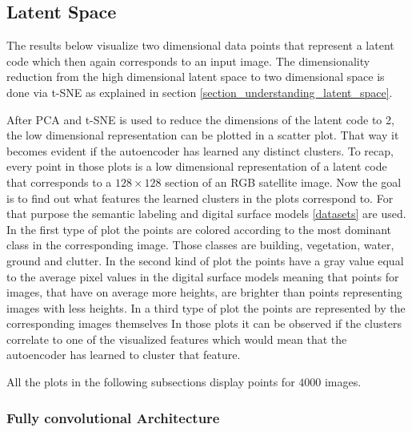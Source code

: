 
\subsection{Latent Space} \label{latent_space_experiments}

The results below visualize two dimensional data points that represent a latent code which then again corresponds
to an input image. The dimensionality reduction from the high dimensional latent space to two dimensional space
is done via t-SNE as  explained in section \ref{section_understanding_latent_space}.

After PCA and t-SNE is used to reduce the dimensions of the latent code to 2, the low dimensional representation can be
plotted in a scatter plot. That way it becomes evident if the autoencoder has learned any distinct clusters.
To recap, every point in those plots is a low dimensional representation of a latent code that corresponds to
a $128 \times 128$ section of an RGB satellite image. 
Now the goal is to find out what features the learned clusters in the plots correspond to. For that purpose the
semantic labeling and digital surface models \ref{datasets} are used. In the first type of plot the points
are colored according to the most dominant class in the corresponding image. Those classes are building, vegetation,
water, ground and clutter. In the second kind of plot the points have a gray value equal to the average pixel
values in the digital surface models meaning that points for images, that have on average more heights, are brighter
than points representing images with less heights.
In a third type of plot the points are represented by the corresponding images themselves 
In those plots it can be observed if the clusters correlate to one of the visualized features which would mean that
the autoencoder has learned to cluster that feature.

All the plots in the following subsections display points for $4000$ images.

\subsubsection{Fully convolutional Architecture}

